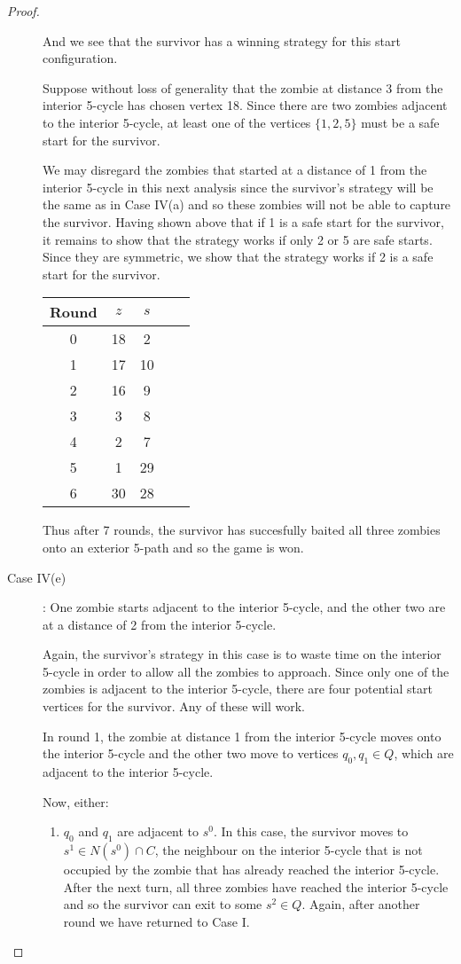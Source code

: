 \begin{proof}
\begin{description}
And we see that the survivor has a winning strategy for this start configuration.

Suppose without loss of generality that the zombie at distance 3 from the interior 5-cycle has chosen vertex 18.
Since there are two zombies adjacent to the interior 5-cycle, at least one of the vertices $\{1, 2, 5\}$ must be a safe start for the survivor.

We may disregard the zombies that started at a distance of 1 from the interior 5-cycle in this next analysis since the survivor's strategy will be the
same as in Case IV(a) and so these zombies will not be able to capture the survivor. Having shown above that if 1 is a safe start for the survivor, it
remains to show that the strategy works if only 2 or 5 are safe starts. Since they are symmetric, we show that the strategy works if 2 is a safe start for the
survivor.

\begin{tabular}{c | c | c | c | c }
Round & $z$ & $s$ \\
\hline
0 & 18 & 2 \\
1 & 17 & 10 \\
2 & 16 & 9 \\
3 & 3 & 8 \\
4 & 2 & 7 \\
5 & 1 & 29 \\
6 & 30 & 28
\end{tabular}

Thus after 7 rounds, the survivor has succesfully baited all three zombies onto an exterior 5-path and so the game is won.

\item[Case IV(e)]: One zombie starts adjacent to the interior 5-cycle, and the other two are at a distance of 2 from the interior 5-cycle.

Again, the survivor's strategy in this case is to waste time on the interior 5-cycle in order to allow all the zombies to approach. Since only one of the
zombies is adjacent to the interior 5-cycle, there are four potential start vertices for the survivor. Any of these will work.

In round 1, the zombie at distance 1 from the interior 5-cycle moves onto the interior 5-cycle and the other two move to vertices $q_0, q_1 \in Q$,
which are adjacent to the interior 5-cycle.

Now, either:

\begin{enumerate}
\item $q_0$ and $q_1$ are adjacent to $s^0$. In this case, the survivor moves to $s^1 \in N(s^0) \cap C$, the neighbour on the interior 5-cycle that is not occupied
by the zombie that has already reached the interior 5-cycle. After the next turn, all three zombies have reached the interior 5-cycle and so the survivor can
exit to some $s^2 \in Q$. Again, after another round we have returned to Case I.


\end{enumerate}
\end{description}
\end{proof}
